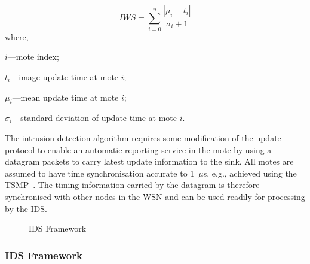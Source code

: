 \documentclass[conference,final]{IEEEtran}
\begin{document}
\begin{equation}
\label{eqn2} 
	\mathit{IWS} = \sum \limits_{i=0}^{n} \frac{\left| \mu_i - t_i \right|}{\sigma_i + 1}
\end{equation}
where, 
\begin{inparaenum}
\item $\mathit{i}$---mote index;%
\item $\mathit{t_i}$---image update time at mote $\mathit{i}$;  
\item $\mathit{\mu_i}$---mean update time at mote $\mathit{i}$;  
\item $\mathit{\sigma_i}$---standard deviation of update time at mote $\mathit{i}$. 
\end{inparaenum}

The intrusion detection algorithm requires some modification of the update protocol to enable an automatic reporting service in the mote by using a datagram packets to carry latest update information to the sink.
All motes are assumed to have time synchronisation accurate to 1~$\mu$s, e.g., achieved using the TSMP~\cite{Pister08tsmp:time}.
The timing information carried by the datagram is therefore synchronised with other nodes in the WSN and can be used readily for processing by the IDS.

\begin{figure}[btp]
    \centering
    \caption{IDS Framework}
    \label{fig:ids_fw}
\end{figure}

\subsubsection*{IDS Framework}
\label{ssc:ids_fw}
\end{document}
